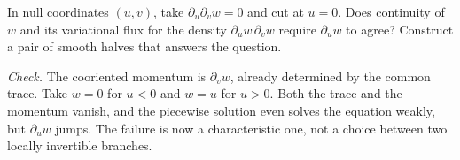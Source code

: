 \begin{exercise}
In null coordinates $(u,v)$, take $\partial_u\partial_v w=0$ and cut at $u=0$. Does continuity of $w$ and its variational flux for the density $\partial_u w\,\partial_v w$ require $\partial_u w$ to agree? Construct a pair of smooth halves that answers the question.
\end{exercise}
\noindent\emph{Check.} The cooriented momentum is $\partial_v w$, already determined by the common trace. Take $w=0$ for $u<0$ and $w=u$ for $u>0$. Both the trace and the momentum vanish, and the piecewise solution even solves the equation weakly, but $\partial_u w$ jumps. The failure is now a characteristic one, not a choice between two locally invertible branches.
